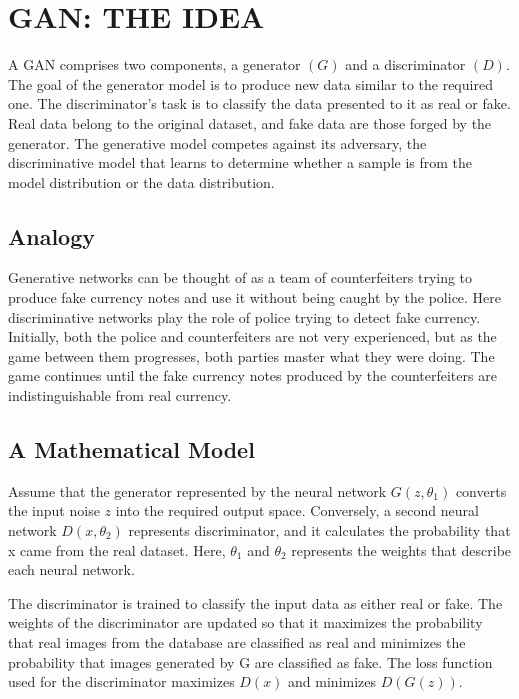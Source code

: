 \chapter{GAN: THE IDEA}
\label{chapter:gan}
\begin{onehalfspace}
    A GAN comprises two components, a generator $(G)$ and a discriminator $(D)$. 
    The goal of the generator model is to produce new data similar to the required 
    one. The discriminator's task is to classify the data presented to it as real or 
    fake. Real data belong to the original dataset, and fake data are those 
    forged by the generator. The generative model competes against its adversary, 
    the discriminative model that learns to determine whether a sample is from the 
    model distribution or the data distribution.    
\section{Analogy}
    Generative networks can be thought of as a team of counterfeiters trying 
    to produce fake currency notes and use it without being caught by the 
    police. Here discriminative networks play the role of police trying to 
    detect fake currency. Initially, both the police and counterfeiters are not 
    very experienced, but as the game between them progresses, both parties 
    master what they were doing.  The game continues until the fake currency 
    notes produced by the counterfeiters are indistinguishable from real 
    currency.

\section{A Mathematical Model}

    Assume that the generator represented by the neural network 
    \(G(z, \theta_{1})\) converts the input noise \(z\) into the required output 
    space. Conversely, a second neural network \(D(x, \theta_{2})\) represents 
    discriminator, and it calculates the probability that x came from the real 
    dataset. Here, $\theta_{1}$ and $\theta_{2}$ represents the weights that 
    describe each neural network.

    The discriminator is trained to classify the input data as either real or 
    fake. The weights of the discriminator are updated so that it maximizes the 
    probability that real images from the database are classified as real and 
    minimizes the probability that images generated by G are classified as fake. 
    The loss function used for the discriminator maximizes \(D(x)\) and minimizes 
    \(D(G(z))\). 


\end{onehalfspace}
